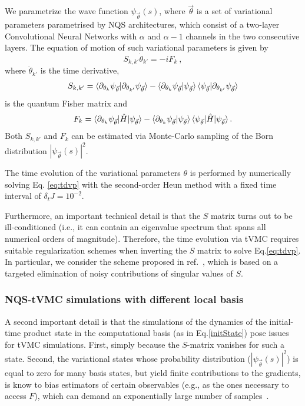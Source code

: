\documentclass[aps,pra,reprint,amssymb,superscriptaddress]{revtex4-2}
\begin{document}
We parametrize the wave function $\psi_{\vec{\theta}}(s)$, where $\vec{\theta}$ is a set of variational parameters parametrised by  NQS architectures, which consist
of a two-layer Convolutional Neural Networks with $\alpha$ and $\alpha -1 $ channels in the two consecutive layers.  The equation of motion of such variational parameters is given by 
\begin{equation}
    S_{k,k'} \dot{\theta}_{k'}=-iF_k\ ,
    \label{eq:tdvp}
\end{equation}
where $\dot{\theta}_{k'}$ is the time derivative, 
\begin{equation}
\begin{split}
S_{k,k'}=\braket{\partial_{\theta_k}\psi_{\vec\theta}|\partial_{\theta_{k'}}\psi_{\vec\theta}}
-\braket{\partial_{\theta_k}\psi_{\vec\theta}|\psi_{\vec\theta}}\braket{\psi_{\vec\theta}|\partial_{\theta_{k'}}\psi_{\vec\theta}}
\label{Skk}
\end{split}
\end{equation}
is the quantum Fisher matrix and 
\begin{equation}
\begin{split}
F_{k}=\braket{\partial_{\theta_k}\psi_{\vec\theta}|\hat H|\psi_{\vec\theta}}-\braket{\partial_{\theta_k}\psi_{\vec\theta}|\psi_{\vec\theta}}\braket{\psi_{\vec\theta}|\hat H|\psi_{\vec\theta}}.
\label{Fk}
\end{split}
\end{equation}
Both $S_{k,k'}$ and $F_k$ can be estimated via Monte-Carlo sampling of the Born distribution $|\psi_{\vec\theta}(s)|^2$.


The time evolution of the variational parameters $\theta$ is performed
by numerically solving Eq. \ref{eq:tdvp} with the
second-order Heun method 
with a fixed time interval of $\delta_t J =  10^{-2}$.

Furthermore, an important technical detail is that the $S$ matrix turns out to be ill-conditioned (i.e., it can contain an eigenvalue spectrum that spans all numerical orders of magnitude). Therefore, the time evolution via tVMC requires suitable regularization schemes when inverting the $S$ matrix to solve  Eq.\eqref{eq:tdvp}. In particular, we consider the scheme proposed in ref.~\cite{schmitt_quantum_2020}, which is based on a targeted elimination of noisy contributions of singular values of $S$.


\subsubsection{NQS-tVMC simulations with different local basis}
\label{app:localbasisNQS}
A second important detail is that the simulations of the dynamics of the initial-time product state in the computational basis (as in Eq.\ref{initState}) pose issues for tVMC simulations. First, simply because the $S$-matrix vanishes for such a state. Second, the variational states whose probability distribution ($|\psi_{\vec\theta}(s)|^2$) is equal to zero for many basis states, but yield finite contributions to the gradients,  is know to bias estimators of certain observables (e.g., as the ones necessary to access $F$), which can demand an exponentially large number of samples~\cite{sinibaldi_unbiasing_2023}.
\end{document}
